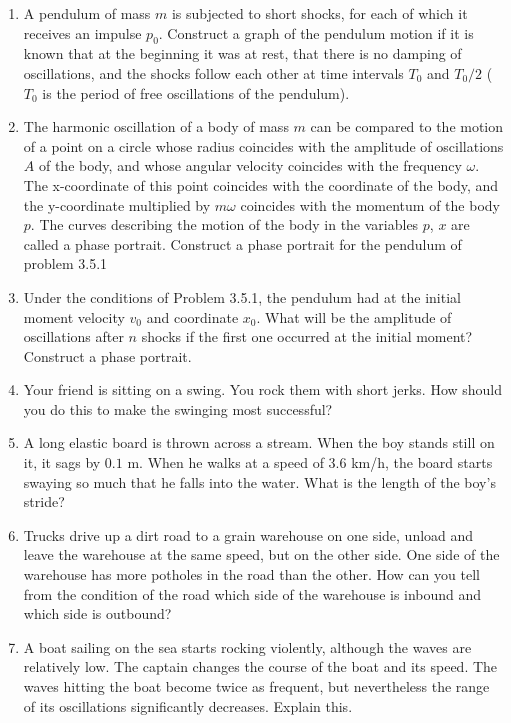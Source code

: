 \documentclass{article}
\begin{document}
\begin{enumerate}[label=3.5.\arabic*]

\item A pendulum of mass $m$ is subjected to short shocks, for each of which it receives an impulse $p_0$. Construct a graph of the pendulum motion if it is known that at the beginning it was at rest, that there is no damping of oscillations, and the shocks follow each other at time intervals $T_0$ and $T_0/2$ ($T_0$ is the period of free oscillations of the pendulum).

\item The harmonic oscillation of a body of mass $m$ can be compared to the motion of a point on a circle whose radius coincides with the amplitude of oscillations $A$ of the body, and whose angular velocity coincides with the frequency $\omega$. The x-coordinate of this point coincides with the coordinate of the body, and the y-coordinate multiplied by $m \omega$ coincides with the momentum of the body $p$. The curves describing the motion of the body in the variables $p$, $x$ are called a phase portrait. Construct a phase portrait for the pendulum of problem 3.5.1

\item Under the conditions of Problem 3.5.1, the pendulum had at the initial moment velocity $v_0$ and coordinate $x_0$. What will be the amplitude of oscillations after $n$ shocks if the first one occurred at the initial moment? Construct a phase portrait.

\item Your friend is sitting on a swing. You rock them with short jerks. How should you do this to make the swinging most successful?

\item A long elastic board is thrown across a stream. When the boy stands still on it, it sags by $0.1$ m. When he walks at a speed of $3.6$ km/h, the board starts swaying so much that he falls into the water. What is the length of the boy's stride?

\item Trucks drive up a dirt road to a grain warehouse on one side, unload and leave the warehouse at the same speed, but on the other side. One side of the warehouse has more potholes in the road than the other. How can you tell from the condition of the road which side of the warehouse is inbound and which side is outbound?

\item A boat sailing on the sea starts rocking violently, although the waves are relatively low. The captain changes the course of the boat and its speed. The waves hitting the boat become twice as frequent, but nevertheless the range of its oscillations significantly decreases. Explain this.


\end{enumerate}
\end{document}

